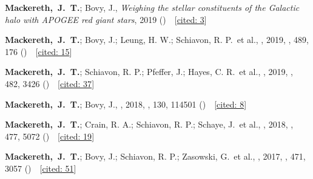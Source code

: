 \item[{\scriptsize6}]\textbf{Mackereth,~J.~T.}; Bovy, J., \textit{Weighing the stellar constituents of the Galactic halo with APOGEE red giant stars}, 2019 ()~~{\footnotesize[\href{http://adsabs.harvard.edu/abs/2019arXiv191003590M}{cited: 3}]}

\item[{\scriptsize5}]\textbf{Mackereth,~J.~T.}; Bovy, J.; Leung, H. W.; Schiavon, R. P.~et al., , 2019, \mnras, {489}, 176 ()~~{\footnotesize[\href{http://adsabs.harvard.edu/abs/2019MNRAS.489..176M}{cited: 15}]}

\item[{\scriptsize4}]\textbf{Mackereth,~J.~T.}; Schiavon, R. P.; Pfeffer, J.; Hayes, C. R.~et al., , 2019, \mnras, {482}, 3426 ()~~{\footnotesize[\href{http://adsabs.harvard.edu/abs/2019MNRAS.482.3426M}{cited: 37}]}

\item[{\scriptsize3}]\textbf{Mackereth,~J.~T.}; Bovy, J., , 2018, \pasp, {130}, 114501 ()~~{\footnotesize[\href{http://adsabs.harvard.edu/abs/2018PASP..130k4501M}{cited: 8}]}

\item[{\scriptsize2}]\textbf{Mackereth,~J.~T.}; Crain, R. A.; Schiavon, R. P.; Schaye, J.~et al., , 2018, \mnras, {477}, 5072 ()~~{\footnotesize[\href{http://adsabs.harvard.edu/abs/2018MNRAS.477.5072M}{cited: 19}]}

\item[{\scriptsize1}]\textbf{Mackereth,~J.~T.}; Bovy, J.; Schiavon, R. P.; Zasowski, G.~et al., , 2017, \mnras, {471}, 3057 ()~~{\footnotesize[\href{http://adsabs.harvard.edu/abs/2017MNRAS.471.3057M}{cited: 51}]}